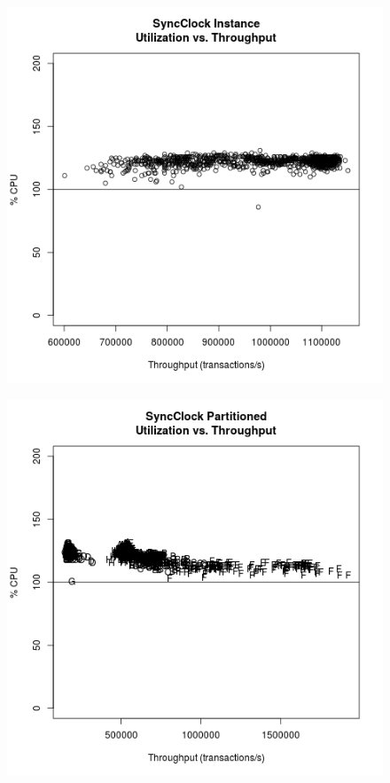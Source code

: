 \begin{figure}
\center
\includegraphics[height=.25\textheight]{sync_instance_throughput_utilization.png}
\caption{\label{sync_instance_throughput_utilization}}
\end{figure}

\begin{figure}
\center
\includegraphics[height=.25\textheight]{sync_partitioned_throughput_utilization.png}
\caption{\label{sync_partitioned_throughput_utilization}}
\end{figure}

